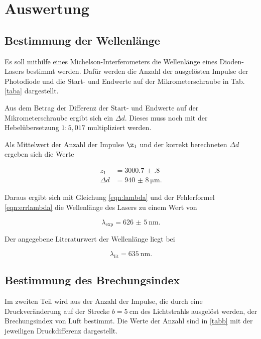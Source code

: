 \section{Auswertung}
\label{sec:Auswertung}

\subsection{Bestimmung der Wellenlänge}
Es soll mithilfe eines Michelson-Interferometers die Wellenlänge eines Dioden-Lasers bestimmt werden. 
Dafür werden die Anzahl der ausgelösten Impulse der Photodiode und die Start- und Endwerte auf der Mikrometerschraube in Tab. \ref{taba} dargestellt.  



\noindent Aus dem Betrag der Differenz der Start- und Endwerte auf der Mikrometerschraube ergibt sich ein $\Delta d$. Dieses muss noch mit der Hebelübersetzung $1:5,017$  multipliziert werden. 

\noindent Als Mittelwert der Anzahl der Impulse $\z_1$ und der korrekt berechneten $\Delta d$ ergeben sich die Werte 

\begin{align*} 
   z_1 &= \num{3000.7(8)} \\
   \Delta d &= \SI{940(8)}{\micro\meter}.
\end{align*}

\noindent Daraus ergibt sich mit Gleichung \eqref{eqn:lambda} und der Fehlerformel \eqref{eqn:errlambda} die Wellenlänge des Lasers zu einem Wert von 

\begin{equation*}
    \lambda_\text{exp} = \SI{626(5)}{\nano\meter}.
\end{equation*}

\noindent Der angegebene Literaturwert der Wellenlänge liegt bei 

\begin{equation*}
    \lambda_\text{lit} = \SI{635}{\nano\meter}.
\end{equation*}

\subsection{Bestimmung des Brechungsindex}
Im zweiten Teil wird aus der Anzahl der Impulse, die durch eine Druckveränderung auf der Strecke $b = \SI{5}{\centi\meter}$ des Lichtstrahls ausgelöst werden, der Brechungsindex von Luft bestimmt. 
Die Werte der Anzahl sind in \ref{tabb} mit der jeweiligen Druckdifferenz dargestellt.

